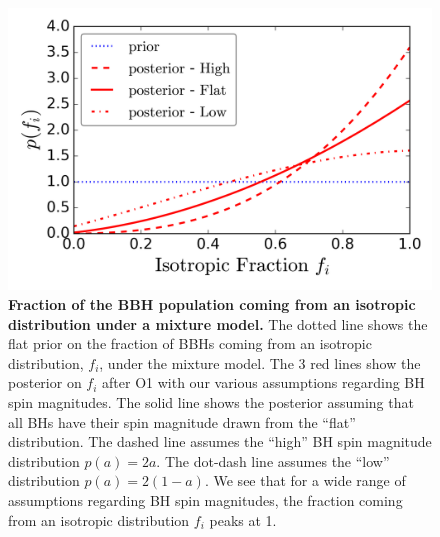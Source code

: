 \documentclass{nature}
\begin{document}
\begin{methods}
%
\begin{figure}
\centering
\includegraphics[width=\textwidth]{../plots/posterior_on_isotropic_fraction.png}
\caption{\textbf{Fraction of the BBH population coming from an isotropic
  distribution under a mixture model.} The dotted line shows the flat
  prior on the fraction of BBHs coming from an isotropic distribution,
  $f_i$, under the mixture model. The 3 red lines show the posterior
  on $f_i$ after O1 with our various assumptions regarding BH spin
  magnitudes.  The solid line shows the posterior assuming that all
  BHs have their spin magnitude drawn from the ``flat''
  distribution. The dashed line assumes the ``high'' BH spin magnitude
  distribution $p(a) = 2a$. The dot-dash line assumes the ``low''
  distribution $p(a) = 2(1-a)$.  We see that for a wide range of
  assumptions regarding BH spin magnitudes, the fraction coming from
  an isotropic distribution $f_i$ peaks at 1.}
\label{fig:mixture_fraction_posterior}
\end{figure}
%

%


\end{methods}
\end{document}
